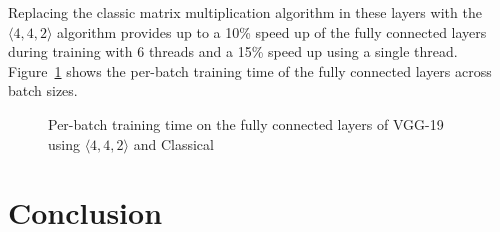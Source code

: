 \documentclass[manuscript]{acmart}
\newcommand{\dims}[1]{\langle #1 \rangle}
\begin{document}

Replacing the classic matrix multiplication algorithm in these layers with the $\dims{4,4,2}$ algorithm provides up to a 10\% speed up of the fully connected layers during training with 6 threads and a 15\% speed up using a single thread. 
Figure~\ref{fig:vgg} shows the per-batch training time of the fully connected layers across batch sizes.

\begin{figure}
%
%
\hfill	
{}
%
\caption{Per-batch training time on the fully connected layers of VGG-19 using $\dims{4,4,2}$ and Classical}
\label{fig:vgg}
\end{figure}

\section{Conclusion}
\end{document}
